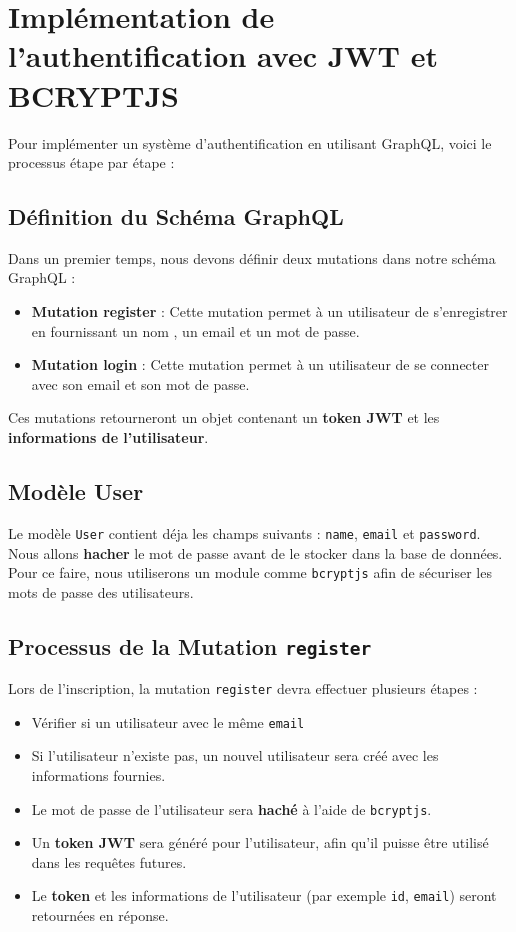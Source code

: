 \documentclass{article}
\begin{document}
\section{Implémentation de l'authentification avec JWT et BCRYPTJS}

Pour implémenter un système d'authentification en utilisant GraphQL, voici le processus étape par étape :

\subsection{Définition du Schéma GraphQL}
Dans un premier temps, nous devons définir deux mutations dans notre schéma GraphQL :
\begin{itemize}
    \item \textbf{Mutation register} : Cette mutation permet à un utilisateur de s'enregistrer en fournissant un nom , un email et un mot de passe.
    \item \textbf{Mutation login} : Cette mutation permet à un utilisateur de se connecter avec son email et son mot de passe.
\end{itemize}
Ces mutations retourneront un objet contenant un \textbf{token JWT} et les \textbf{informations de l'utilisateur}.

\subsection{Modèle User}
Le modèle \texttt{User} contient déja les champs suivants : \texttt{name}, \texttt{email} et \texttt{password}. 
Nous allons \textbf{hacher} le mot de passe avant de le stocker dans la base de données. 
Pour ce faire, nous utiliserons un module comme \texttt{bcryptjs} afin de sécuriser les mots de passe des utilisateurs.

\subsection{Processus de la Mutation \texttt{register}}
Lors de l'inscription, la mutation \texttt{register} devra effectuer plusieurs étapes :
\begin{itemize}
    \item Vérifier si un utilisateur avec le même \texttt{email} 
    \item Si l'utilisateur n'existe pas, un nouvel utilisateur sera créé avec les informations fournies.
    \item Le mot de passe de l'utilisateur sera \textbf{haché} à l'aide de \texttt{bcryptjs}.
    \item Un \textbf{token JWT} sera généré pour l'utilisateur, afin qu'il puisse être utilisé dans les requêtes futures.
    \item Le \textbf{token} et les informations de l'utilisateur (par exemple \texttt{id}, \texttt{email}) seront retournées en réponse.
\end{itemize}
\end{document}
